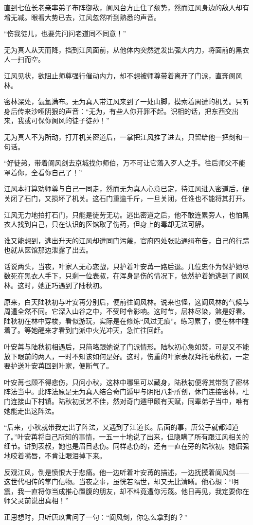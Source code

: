直到七位长老亲率弟子布阵御敌，阆风台方止住了颓势，然而江风身边的敌人却有增无减。眼看大势已去，江风忽然听到熟悉的声音。

“伤我徒儿，也要先问问老道同不同意！”

无为真人从天而降，挡到江风面前，从他体内突然迸发出强大内力，将面前的黑衣人一扫而空。

江风见状，欲阻止师尊强行催动内力，却不想被师尊带着离开了门派，直奔阆风林。

密林深处，氤氲满布。无为真人带江风来到了一处山脚，摸索着周遭的机关。只听身后传来沙哑阴狠的声音：“无为，有些人你开罪不起。识相的话，把东西交出来，我或可保你阆风的徒子徒孙！”

无为真人不为所动，打开机关密道后，一掌把江风推了进去，只留给他一把剑和一句话。

“好徒弟，带着阆风剑去京城找你师伯，万不可让它落入歹人之手。往后师父不能罩着你，全看你自己了！”

江风本打算劝师尊与自己一同走，然而无为真人心意已定，待江风进入密道后，便关闭了石门，又损坏了机关。这石门重逾千斤，一旦关闭，任谁也不能将其打开。

江风无力地拍打石门，只能是徒劳无功。逃出密道之后，他不敢连累旁人，也怕黑衣人找到自己，只在认识的医馆取了伤药，但身上的毒却无法可解。

谁又能想到，逃出升天的江风却遭同门污蔑，官府四处张贴通缉布告，自己的行踪也就从医馆那边泄露了出去。

话说两头，当夜，叶家人无心恋战，只护着叶安苒一路后退。几位忠仆为保护她尽数死在黑衣人手下，只剩一位表叔，在浑身是伤的情况下，依然护着她逃到了阆风林。这时，她正巧遇到了陆秋初。

原来，白天陆秋初与叶安苒分别后，便前往阆风林。说来也怪，这阆风林的气候与周遭全然不同。它深入山谷之中，不受时令影响。这时节，层林尽染，煞是好看。陆秋初在林中穿梭，看似游玩，实际是在修炼“风过无痕”。练习累了，便在林中睡着了。等她醒来才看到门派中火光冲天，急忙往回赶。

叶安苒与陆秋初相遇后，只简略跟她说了门派情形。陆秋初心急如焚，可是又不能放下眼前的两人，一时不知该如何是好。这时，伤重的叶家表叔拜托陆秋初，一定要护送叶安苒回到叶家，便断气了。

叶安苒也顾不得悲伤，只问小秋，这林中哪里可以藏身，陆秋初便将其带到了密林阵法当中。此阵法原是无为真人结合奇门遁甲与阴阳八卦所创，休门连接密林，杜门连接山下村镇。陆秋初武艺不佳，然对奇门遁甲颇有天赋，同辈弟子当中，唯有她能走出这阵法。

“后来，小秋就带我走出了阵法，又遇到了江道长。后面的事，唐公子就都知道了。”叶安苒将自己所知的事情，一五一十地说了出来，但隐瞒了所有跟江风相关的细节。讲到表叔，她也是眉目悲伤。同样悲伤的，还有一直在旁的陆秋初。她倔强地咬着嘴唇，不肯让眼泪掉下来。

反观江风，倒是愤恨大于悲痛。他一边听着叶安苒的描述，一边抚摸着阆风剑——这世代相传的掌门信物。当夜之事，虽恍若隔世，却又无比清晰。他心想：“明震，我一直将你当成推心置腹的朋友，却不料竟遭你污蔑。他日再见，我定要你在师父灵前说出真相！”

正思想时，只听唐玖言问了一句：“阆风剑，你怎么拿到的？”